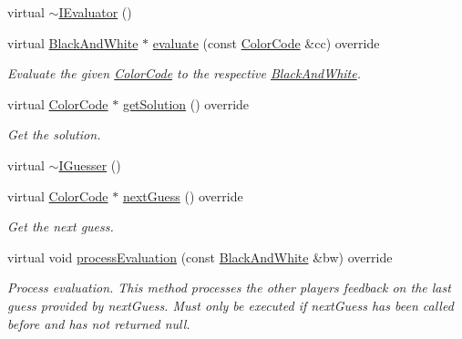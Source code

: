 \begin{DoxyCompactItemize}
\item 
virtual \hyperlink{classmastermind_1_1logic_1_1abstract_a901e84f7a39b9b80224a94ec90b14c25}{$\sim$\+I\+Evaluator} ()
\item 
virtual \hyperlink{classmastermind_1_1logic_1_1_black_and_white}{Black\+And\+White} $\ast$ \hyperlink{classmastermind_1_1logic_1_1abstract_a42fd7e506150c1f6a486f9619a7cc337}{evaluate} (const \hyperlink{classmastermind_1_1logic_1_1_color_code}{Color\+Code} \&cc) override
\begin{DoxyCompactList}\small\item\em Evaluate the given \hyperlink{classmastermind_1_1logic_1_1_color_code}{Color\+Code} to the respective \hyperlink{classmastermind_1_1logic_1_1_black_and_white}{Black\+And\+White}. \end{DoxyCompactList}\item 
virtual \hyperlink{classmastermind_1_1logic_1_1_color_code}{Color\+Code} $\ast$ \hyperlink{classmastermind_1_1logic_1_1abstract_a3d7e6bdbf8f3926fd42907d86291a373}{get\+Solution} () override
\begin{DoxyCompactList}\small\item\em Get the solution. \end{DoxyCompactList}\item 
virtual \hyperlink{classmastermind_1_1logic_1_1abstract_a54d92c8c0accd2d4fbc7ea47f898c18f}{$\sim$\+I\+Guesser} ()
\item 
virtual \hyperlink{classmastermind_1_1logic_1_1_color_code}{Color\+Code} $\ast$ \hyperlink{classmastermind_1_1logic_1_1abstract_ae4e30322061ea0ebc302274c79c5ca47}{next\+Guess} () override
\begin{DoxyCompactList}\small\item\em Get the next guess. \end{DoxyCompactList}\item 
virtual void \hyperlink{classmastermind_1_1logic_1_1abstract_ad44cfe3ef7f44a27de1522a6510ebd07}{process\+Evaluation} (const \hyperlink{classmastermind_1_1logic_1_1_black_and_white}{Black\+And\+White} \&bw) override
\begin{DoxyCompactList}\small\item\em Process evaluation. This method processes the other player\textquotesingle{}s feedback on the last guess provided by {\ttfamily next\+Guess}. Must only be executed if {\ttfamily next\+Guess} has been called before and has not returned {\ttfamily null}. \end{DoxyCompactList}\end{DoxyCompactItemize}


